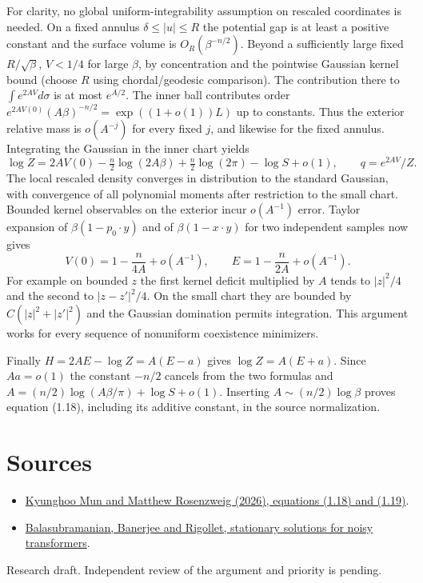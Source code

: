 \documentclass[10pt]{article}
\begin{document}
For clarity, no global uniform-integrability assumption on rescaled coordinates is needed. On a fixed annulus $\delta\le|u|\le R$ the potential gap is at least a positive constant and the surface volume is $O_R(\beta^{-n/2})$. Beyond a sufficiently large fixed $R/\sqrt\beta$, $V<1/4$ for large $\beta$, by concentration and the pointwise Gaussian kernel bound (choose $R$ using chordal/geodesic comparison). The contribution there to $\int e^{2A V}d\sigma$ is at most $e^{A/2}$. The inner ball contributes order $e^{2A V(0)}(A\beta)^{-n/2}=\exp((1+o(1))L)$ up to constants. Thus the exterior relative mass is $o(A^{-j})$ for every fixed $j$, and likewise for the fixed annulus. Integrating the Gaussian in the inner chart yields
\[
 \log Z=2AV(0)-\tfrac n2\log(2A\beta)+\tfrac n2\log(2\pi)-\log S+o(1),
 \qquad q=e^{2AV}/Z.
\]
The local rescaled density converges in distribution to the standard Gaussian, with convergence of all polynomial moments after restriction to the small chart. Bounded kernel observables on the exterior incur $o(A^{-1})$ error. Taylor expansion of $\beta(1-p_0\cdot y)$ and of $\beta(1-x\cdot y)$ for two independent samples now gives
\[
 V(0)=1-\frac{n}{4A}+o(A^{-1}),\qquad
 E=1-\frac{n}{2A}+o(A^{-1}).
\]
For example on bounded $z$ the first kernel deficit multiplied by $A$ tends to $|z|^2/4$ and the second to $|z-z'|^2/4$. On the small chart they are bounded by $C(|z|^2+|z'|^2)$ and the Gaussian domination permits integration. This argument works for every sequence of nonuniform coexistence minimizers.

Finally $H=2AE-\log Z=A(E-a)$ gives $\log Z=A(E+a)$. Since $Aa=o(1)$ the constant $-n/2$ cancels from the two formulas and $A=(n/2)\log(A\beta/\pi)+\log S+o(1)$. Inserting $A\sim(n/2)\log\beta$ proves equation (1.18), including its additive constant, in the source normalization.

\section*{Sources}
\begin{itemize}
\item \href{https://arxiv.org/abs/2606.05140}{Kyunghoo Mun and Matthew Rosenzweig (2026), equations (1.18) and (1.19)}.
\item \href{https://arxiv.org/abs/2510.20094}{Balasubramanian, Banerjee and Rigollet, stationary solutions for noisy transformers}.
\end{itemize}
{\small Research draft. Independent review of the argument and priority is pending.}
\end{document}
